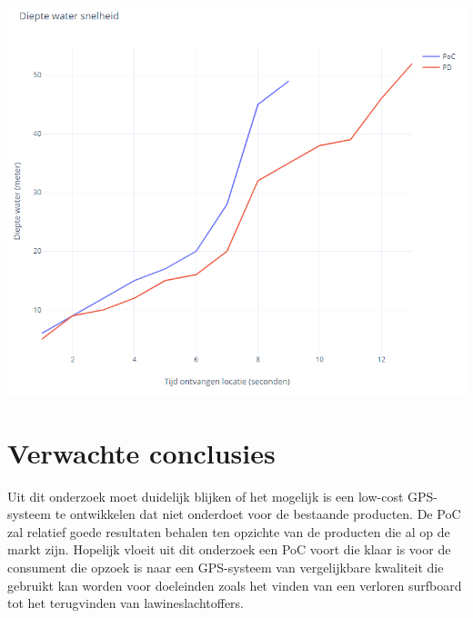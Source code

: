\includegraphics[width=\textwidth,height=\textheight,keepaspectratio]{waterDepth}
\clearpage
\section{Verwachte conclusies}
\label{sec:verwachte_conclusies}

Uit dit onderzoek moet duidelijk blijken of het mogelijk is een low-cost GPS-systeem te ontwikkelen dat niet onderdoet voor de bestaande producten. De PoC zal relatief goede resultaten behalen ten opzichte van de producten die al op de markt zijn. 
Hopelijk vloeit uit dit onderzoek een PoC voort die klaar is voor de consument die opzoek is naar een GPS-systeem van vergelijkbare kwaliteit die gebruikt kan worden voor doeleinden zoals het vinden van een verloren surfboard tot het terugvinden van lawineslachtoffers.


